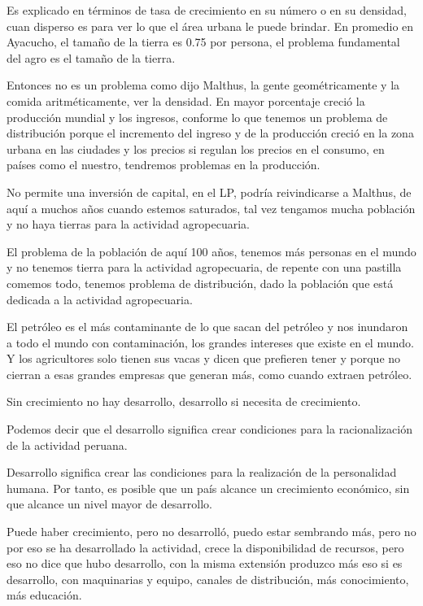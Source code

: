 \documentclass[
  letterpaper,
  DIV=11,
  numbers=noendperiod]{scrartcl}
\begin{document}
Es explicado en términos de tasa de crecimiento en su número o en su
densidad, cuan disperso es para ver lo que el área urbana le puede
brindar. En promedio en Ayacucho, el tamaño de la tierra es 0.75 por
persona, el problema fundamental del agro es el tamaño de la tierra.

Entonces no es un problema como dijo Malthus, la gente geométricamente y
la comida aritméticamente, ver la densidad. En mayor porcentaje creció
la producción mundial y los ingresos, conforme lo que tenemos un
problema de distribución porque el incremento del ingreso y de la
producción creció en la zona urbana en las ciudades y los precios si
regulan los precios en el consumo, en países como el nuestro, tendremos
problemas en la producción.

No permite una inversión de capital, en el LP, podría reivindicarse a
Malthus, de aquí a muchos años cuando estemos saturados, tal vez
tengamos mucha población y no haya tierras para la actividad
agropecuaria.

El problema de la población de aquí 100 años, tenemos más personas en el
mundo y no tenemos tierra para la actividad agropecuaria, de repente con
una pastilla comemos todo, tenemos problema de distribución, dado la
población que está dedicada a la actividad agropecuaria.

El petróleo es el más contaminante de lo que sacan del petróleo y nos
inundaron a todo el mundo con contaminación, los grandes intereses que
existe en el mundo. Y los agricultores solo tienen sus vacas y dicen que
prefieren tener y porque no cierran a esas grandes empresas que generan
más, como cuando extraen petróleo.

Sin crecimiento no hay desarrollo, desarrollo si necesita de
crecimiento.

Podemos decir que el desarrollo significa crear condiciones para la
racionalización de la actividad peruana.

Desarrollo significa crear las condiciones para la realización de la
personalidad humana. Por tanto, es posible que un país alcance un
crecimiento económico, sin que alcance un nivel mayor de desarrollo.

Puede haber crecimiento, pero no desarrolló, puedo estar sembrando más,
pero no por eso se ha desarrollado la actividad, crece la disponibilidad
de recursos, pero eso no dice que hubo desarrollo, con la misma
extensión produzco más eso si es desarrollo, con maquinarias y equipo,
canales de distribución, más conocimiento, más educación.
\end{document}
